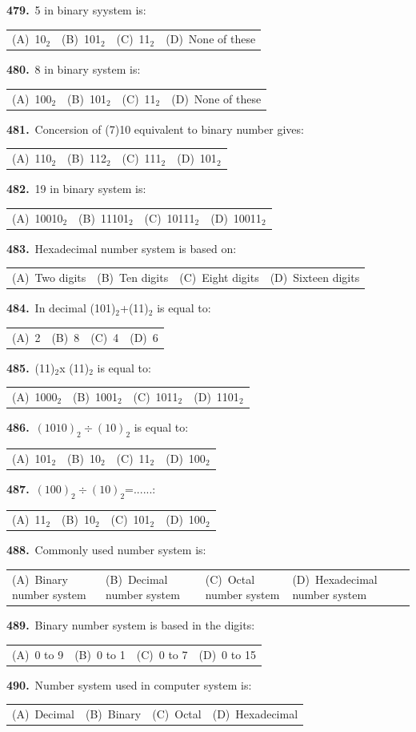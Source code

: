 \documentclass[11pt,a4paper]{article}
\makeatletter
\newcommand{\mcq}[6]{%
  \Needspace{4\baselineskip}%
  \par\medskip\noindent\textbf{#1.}\ #2\par\nopagebreak
  \noindent\begin{tabularx}{\linewidth}{@{\hspace{1.5em}}*{4}{>{\raggedright\arraybackslash}X}@{}}
    (A)~#3 & (B)~#4 & (C)~#5 & (D)~#6
  \end{tabularx}\par}
\makeatother
\begin{document}
\mcq{479}{5 in binary syystem is:}{10$_{2}$}{101$_{2}$}{11$_{2}$}{None of these}
\mcq{480}{8 in binary system is:}{100$_{2}$}{101$_{2}$}{11$_{2}$}{None of these}
\mcq{481}{Concersion of (7)10 equivalent to binary number gives:}{110$_{2}$}{112$_{2}$}{111$_{2}$}{101$_{2}$}
\mcq{482}{19 in binary system is:}{10010$_{2}$}{11101$_{2}$}{10111$_{2}$}{10011$_{2}$}
\mcq{483}{Hexadecimal number system is based on:}{Two digits}{Ten digits}{Eight digits}{Sixteen digits}
\mcq{484}{In decimal (101)$_{2}$+(11)$_{2}$ is equal to:}{2}{8}{4}{6}
\mcq{485}{(11)$_{2}$x (11)$_{2}$ is equal to:}{1000$_{2}$}{1001$_{2}$}{1011$_{2}$}{1101$_{2}$}
\mcq{486}{$(1010)_{2}\div(10)_{2}$ is equal to:}{101$_{2}$}{10$_{2}$}{11$_{2}$}{100$_{2}$}
\mcq{487}{$(100)_{2}\div(10)_{2}$=......:}{11$_{2}$}{10$_{2}$}{101$_{2}$}{100$_{2}$}
\mcq{488}{Commonly used number system is:}{Binary number system}{Decimal number system}{Octal number system}{Hexadecimal number system}
\mcq{489}{Binary number system is based in the digits:}{0 to 9}{0 to 1}{0 to 7}{0 to 15}
\mcq{490}{Number system used in computer system is:}{Decimal}{Binary}{Octal}{Hexadecimal}
\end{document}
